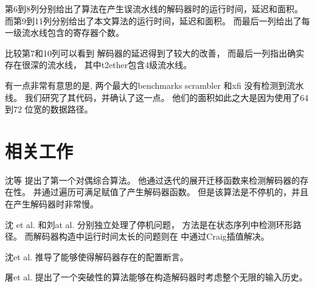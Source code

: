 第6到8列分别给出了\cite{ShenTCAD11}算法在产生误流水线的解码器时的运行时间，延迟和面积。
而第9到11列分别给出了本文算法的运行时间，延迟和面积。
而最后一列给出了每一级流水线包含的寄存器个数。

比较第7和10列可以看到
解码器的延迟得到了较大的改善，
而最后一列指出确实存在很深的流水线，
其中t2ether包含4级流水线。

有一点非常有意思的是,
两个最大的benchmarks scrambler 和xfi 没有检测到流水线。
我们研究了其代码，并确认了这一点。
他们的面积如此之大是因为使用了64 到72 位宽的数据路径。

\section{相关工作}\label{sec_relwork}
沈等\cite{ShenICCAD09} 提出了第一个对偶综合算法。
他通过迭代的展开迁移函数来检测解码器的存在性。
并通过遍历可满足赋值了产生解码器函数。
但是该算法是不停机的，并且在产生解码器时非常慢。

沈 et al.\cite{ShenTCAD11} 和刘at al.\cite{LiuICCAD11} 分别独立处理了停机问题，
方法是在状态序列中检测环形路径。
而解码器构造中运行时间太长的问题则在\cite{ShenTCAD12,LiuICCAD11} 中通过Craig插值\cite{InterpBoolFunction}解决。

沈et al. \cite{ShenTCAD12} 推导了能够使得解码器存在的配置断言。

屠et al.\cite{TuDAC13} 提出了一个突破性的算法能够在构造解码器时考虑整个无限的输入历史。


%
%
%

